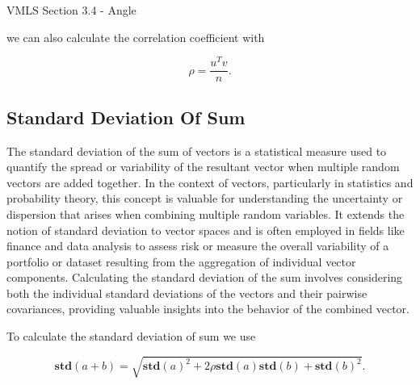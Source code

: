 \begin{notes}{VMLS Section 3.4 - Angle}
\begin{Highlight}
        we can also calculate the correlation coefficient with

        \begin{equation*}
            \rho = \frac{u^{T}v}{n}.
        \end{equation*}
    \end{Highlight}

    \subsection*{Standard Deviation Of Sum}

    The standard deviation of the sum of vectors is a statistical measure used to quantify the spread or variability of the resultant vector when multiple random vectors are added together. In the context of vectors, particularly 
    in statistics and probability theory, this concept is valuable for understanding the uncertainty or dispersion that arises when combining multiple random variables. It extends the notion of standard deviation to vector spaces 
    and is often employed in fields like finance and data analysis to assess risk or measure the overall variability of a portfolio or dataset resulting from the aggregation of individual vector components. Calculating the standard 
    deviation of the sum involves considering both the individual standard deviations of the vectors and their pairwise covariances, providing valuable insights into the behavior of the combined vector.

    \begin{Highlight}
        To calculate the standard deviation of sum we use

        \begin{equation*}
            \mathbf{std}(a + b) = \sqrt{\mathbf{std}(a)^{2} + 2\rho\mathbf{std}(a)\mathbf{std}(b) + \mathbf{std}(b)^{2}}.
        \end{equation*}
    \end{Highlight}
\end{notes}